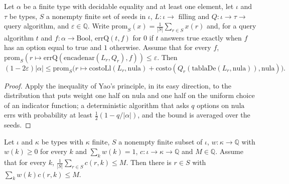 \begin{theorem}
  \label{thm:information-work-random}
  \leanok
  Let $\alpha$ be a finite type with decidable equality and at least one element, let $\iota$ and
  $\tau$ be types, $S$ a nonempty finite set of seeds in $\iota$, $L : \iota \to$ filling and
  $Q : \iota \to \tau \to$ query algorithm, and $\varepsilon \in \mathbb{Q}$. Write
  $\mathrm{prom}_S(x) = \frac{1}{|S|} \sum_{r \in S} x(r)$ and, for a query algorithm $t$ and
  $f : \alpha \to \mathrm{Bool}$, $\mathrm{errQ}(t, f)$ for $0$ if $t$ answers $\mathrm{true}$
  exactly when $f$ has an option equal to $\mathrm{true}$ and $1$ otherwise. Assume that for every
  $f$, $\mathrm{prom}_S(r \mapsto \mathrm{errQ}(\mathrm{encadenar}(L_r, Q_r), f)) \le \varepsilon$.
  Then
  \[
    (1 - 2\varepsilon) |\alpha| \le \mathrm{prom}_S\bigl(r \mapsto \mathrm{costoLl}(L_r, \mathrm{nula}) + \mathrm{costo}(Q_r(\mathrm{tablaDe}(L_r, \mathrm{nula})), \mathrm{nula})\bigr).
  \]
  \own{}
\end{theorem}

\begin{proof}
  \leanok
  Apply the inequality of Yao's principle, in its easy direction, to the distribution that puts weight one half on $\mathrm{nula}$
  and one half on the uniform choice of an indicator function; a deterministic algorithm that asks
  $q$ options on $\mathrm{nula}$ errs with probability at least $\frac12 (1 - q/|\alpha|)$, and
  the bound is averaged over the seeds.
\end{proof}

\begin{theorem}
  \label{thm:information-yao}
  \leanok
  Let $\iota$ and $\kappa$ be types with $\kappa$ finite, $S$ a nonempty finite subset of $\iota$,
  $w : \kappa \to \mathbb{Q}$ with $w(k) \ge 0$ for every $k$ and $\sum_k w(k) = 1$,
  $c : \iota \to \kappa \to \mathbb{Q}$ and $M \in \mathbb{Q}$. Assume that for every $k$,
  $\frac{1}{|S|} \sum_{r \in S} c(r, k) \le M$. Then there is $r \in S$ with
  $\sum_k w(k) c(r, k) \le M$.
  \own{}
\end{theorem}

